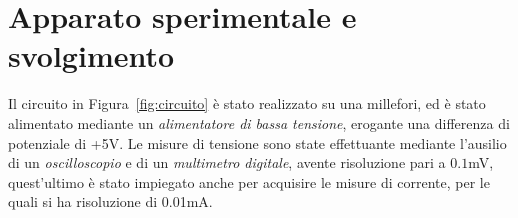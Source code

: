 \documentclass[@MAIN@]{subfiles}
\begin{document}
\section{Apparato sperimentale e svolgimento} \label{sec:acquisizione}
  Il circuito in Figura~\ref{fig:circuito} è stato realizzato su una millefori, ed è stato alimentato mediante un \textit{alimentatore di bassa tensione}, erogante una differenza di potenziale di +5V. 
  Le misure di tensione sono state effettuante mediante l'ausilio di un \textit{oscilloscopio} e di un \textit{multimetro digitale}, avente risoluzione pari a $0.1$mV, quest'ultimo è stato
  impiegato anche per acquisire le misure di corrente, per le quali si ha risoluzione di 0.01mA.
  \\ \\
  

  \begin{center}
    
  \end{center}
  
  \begin{center}
    
  \end{center}

  \begin{center}
    
  \end{center}
\end{document}
